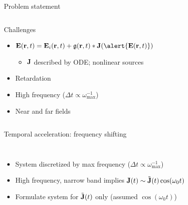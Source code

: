 \documentclass[aspectratio=169, usenames, dvipsnames]{beamer}
\begin{document}
\begin{frame}{Problem statement}
\begin{columns}[t]
      \begin{block}{Challenges}
        \begin{itemize}
          \item $\vb{E}(\vb{r}, t) = \vb{E}_i(\vb{r}, t) + \mathfrak{g}(\vb{r}, t) * \vb{J}(\alert{\vb{E}(\vb{r}, t)})$
            \begin{itemize}
              \item $\vb{J}$ described by ODE; nonlinear sources
            \end{itemize}
          \item Retardation
          \item High frequency ($\Delta t \propto \omega_\text{max}^{-1}$)
          \item Near and far fields
        \end{itemize}
      \end{block}

  \end{columns}
\end{frame}

\begin{frame}{Temporal acceleration: frequency shifting}
  \begin{columns}
      \begin{itemize}
        \item System discretized by max frequency ($\Delta t \propto \omega_\text{max}^{-1}$)
        \item High frequency, narrow band implies $\vb{J}(t) \sim \tilde{\vb{J}}(t)\cos(\omega_0 t)$
        \item Formulate system for $\tilde{\vb{J}}(t)$ only (assumed $\cos(\omega_0 t)$)
      \end{itemize}

      \vspace{0.5cm}
      
  \end{columns}
\end{frame}
\end{document}
